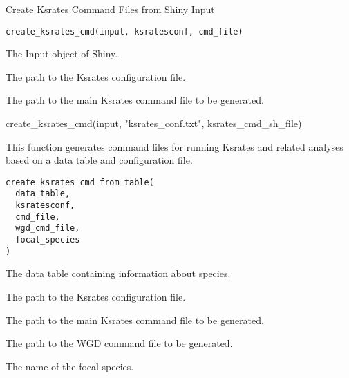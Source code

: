 \documentclass[a4paper]{book}
\begin{document}
%
\begin{Description}\relax
Create Ksrates Command Files from Shiny Input
\end{Description}
%
\begin{Usage}
\begin{verbatim}
create_ksrates_cmd(input, ksratesconf, cmd_file)
\end{verbatim}
\end{Usage}
%
\begin{Arguments}
\begin{ldescription}
\item[\code{input}] The Input object of Shiny.

\item[\code{ksratesconf}] The path to the Ksrates configuration file.

\item[\code{cmd\_file}] The path to the main Ksrates command file to be generated.
\end{ldescription}
\end{Arguments}
%
\begin{Examples}
\begin{ExampleCode}
create_ksrates_cmd(input, "ksrates_conf.txt", ksrates_cmd_sh_file)
\end{ExampleCode}
\end{Examples}
%
\begin{Description}\relax
This function generates command files for running Ksrates and related analyses based on a data table and configuration file.
\end{Description}
%
\begin{Usage}
\begin{verbatim}
create_ksrates_cmd_from_table(
  data_table,
  ksratesconf,
  cmd_file,
  wgd_cmd_file,
  focal_species
)
\end{verbatim}
\end{Usage}
%
\begin{Arguments}
\begin{ldescription}
\item[\code{data\_table}] The data table containing information about species.

\item[\code{ksratesconf}] The path to the Ksrates configuration file.

\item[\code{cmd\_file}] The path to the main Ksrates command file to be generated.

\item[\code{wgd\_cmd\_file}] The path to the WGD command file to be generated.

\item[\code{focal\_species}] The name of the focal species.
\end{ldescription}
\end{Arguments}
\end{document}

